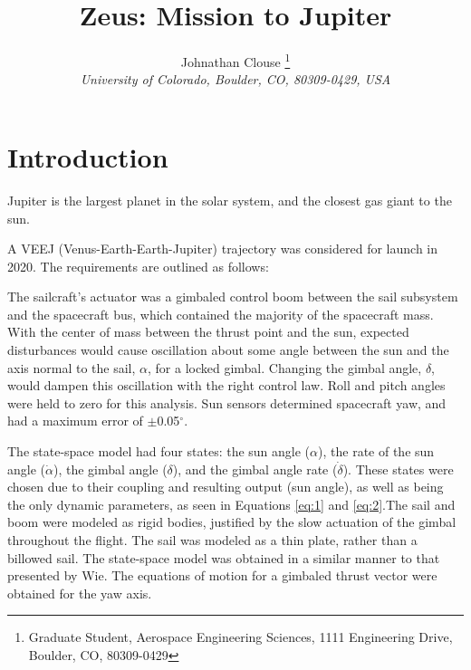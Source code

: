 \documentclass[]{aiaa-tc}%
\title{Zeus: Mission to Jupiter}
\author{
	Johnathan Clouse%
	\thanks{Graduate Student, Aerospace Engineering Sciences, 1111 Engineering Drive, Boulder, CO, 80309-0429}\\
	{\normalsize\itshape
		University of Colorado, Boulder, CO, 80309-0429, USA}
}
\begin{document}
	

	
	\maketitle
	
	\begin{abstract}
		\noindent 
		
	\end{abstract}
	
	\newpage
	
	\tableofcontents
	
	\newpage

	\section{Introduction}
Jupiter is the largest planet in the solar system, and the closest gas giant to the sun. 

A VEEJ (Venus-Earth-Earth-Jupiter) trajectory was considered for launch in 2020. The requirements are outlined as follows:
	
	
	\vspace{5 mm}
	
The sailcraft's actuator was a gimbaled control boom between the sail subsystem and the spacecraft bus, which contained the majority of the spacecraft mass.  With the center of mass between the thrust point and the sun, expected disturbances would cause oscillation about some angle between the sun and the axis normal to the sail, $\alpha$, for a locked gimbal.  Changing the gimbal angle, $\delta$, would dampen this oscillation with the right control law. Roll and pitch angles were held to zero for this analysis. Sun sensors determined spacecraft yaw, and had a maximum error of $\pm$0.05$^{\circ}$.
	
	\vspace{5 mm}

The state-space model had four states: the sun angle ($\alpha$), the rate of the sun angle ($\dot{\alpha}$), the gimbal angle ($\delta$), and the gimbal angle rate ($\dot{\delta}$). These states were chosen due to their coupling and resulting output (sun angle), as well as being the only dynamic parameters, as seen in Equations \ref{eq:1} and \ref{eq:2}.The sail and boom were modeled as rigid bodies, justified by the slow actuation of the gimbal throughout the flight. The sail was modeled as a thin plate, rather than a billowed sail. The state-space model was obtained in a similar manner to that presented by Wie\cite{WieSolarSail2}. The equations of motion for a gimbaled thrust vector were obtained for the yaw axis. 
	
\end{document}
